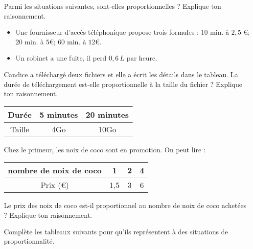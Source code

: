 \begin{pageParcoursu} 

 
Parmi les situations suivantes, sont-elles proportionnelles ? Explique ton raisonnement.
\begin{itemize}[leftmargin=*]
 \item Une fournisseur d'accès téléphonique propose trois formules : $10$ min. à $2,5$ \euro ; $20$  min. à $5$\euro ; $60$  min. à $12$\euro. 
 \item Un robinet a une fuite, il perd $0,6\,L$ par heure. 
\end{itemize}



Candice a téléchargé deux fichiers et elle a écrit les détails dans le tableau. La durée de téléchargement est-elle proportionnelle à la taille du fichier ? Explique ton raisonnement.

\begin{center}
\begin{tabular}{|c|c|c|}
\hline 
Durée & 5 minutes & 20 minutes \\ 
\hline 
Taille & 4Go & 10Go  \\ 
\hline 
\end{tabular} 
\end{center}
 

Chez le primeur, les noix de coco sont en promotion. On peut lire :
\begin{center}
\begin{tabular}{|c|c|c|c|}
\hline 
nombre de noix de coco& 1 & 2 & 4 \\ 
\hline 
Prix (\euro) & 1,5 & 3  & 6  \\ 
\hline 
\end{tabular} 
\end{center}
Le prix des  noix de coco est-il proportionnel au nombre de  noix de coco achetées ? Explique ton raisonnement.
 




Complète les tableaux suivants pour qu'ils représentent à des situations de proportionnalité.


\end{pageParcoursu}
